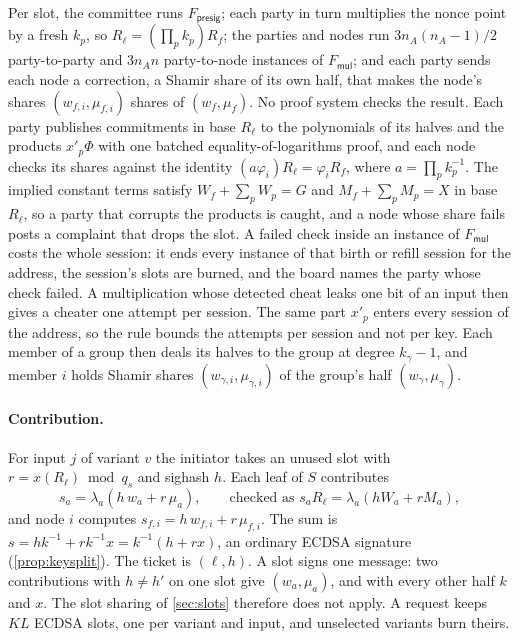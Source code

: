Per slot, the committee runs $F_{\mathsf{presig}}$; each party in turn multiplies the nonce point by a fresh $k_p$, so $R_\ell = (\prod_p k_p) R_f$; the parties and nodes run $3n_A(n_A-1)/2$ party-to-party and $3n_A n$ party-to-node instances of $F_{\mathsf{mul}}$; and each party sends each node a correction, a Shamir share of its own half, that makes the node's shares $(w_{f,i}, \mu_{f,i})$ shares of $(w_f, \mu_f)$. No proof system checks the result. Each party publishes commitments in base $R_\ell$ to the polynomials of its halves and the products $x'_p \Phi$ with one batched equality-of-logarithms proof, and each node checks its shares against the identity $(a\varphi_i) R_\ell = \varphi_i R_f$, where $a = \prod_p k_p^{-1}$. The implied constant terms satisfy $W_f + \sum_p W_p = G$ and $M_f + \sum_p M_p = X$ in base $R_\ell$, so a party that corrupts the products is caught, and a node whose share fails posts a complaint that drops the slot. A failed check inside an instance of $F_{\mathsf{mul}}$ costs the whole session: it ends every instance of that birth or refill session for the address, the session's slots are burned, and the board names the party whose check failed. A multiplication whose detected cheat leaks one bit of an input then gives a cheater one attempt per session. The same part $x'_p$ enters every session of the address, so the rule bounds the attempts per session and not per key. Each member of a group then deals its halves to the group at degree $k_\gamma - 1$, and member $i$ holds Shamir shares $(w_{\gamma,i}, \mu_{\gamma,i})$ of the group's half $(w_\gamma, \mu_\gamma)$.

\paragraph{Contribution.} For input $j$ of variant $v$ the initiator takes an unused slot with $r = x(R_\ell) \bmod q_s$ and sighash $h$. Each leaf of $S$ contributes
\[
  s_a = \lambda_a(h\,w_a + r\,\mu_a), \qquad\text{checked as } s_a R_\ell = \lambda_a(h W_a + r M_a),
\]
and node $i$ computes $s_{f,i} = h\,w_{f,i} + r\,\mu_{f,i}$. The sum is $s = h k^{-1} + r k^{-1} x = k^{-1}(h + r x)$, an ordinary ECDSA signature (\cref{prop:keysplit}). The ticket is $(\ell, h)$. A slot signs one message: two contributions with $h \ne h'$ on one slot give $(w_a, \mu_a)$, and with every other half $k$ and $x$. The slot sharing of \cref{sec:slots} therefore does not apply. A request keeps $KL$ ECDSA slots, one per variant and input, and unselected variants burn theirs.

